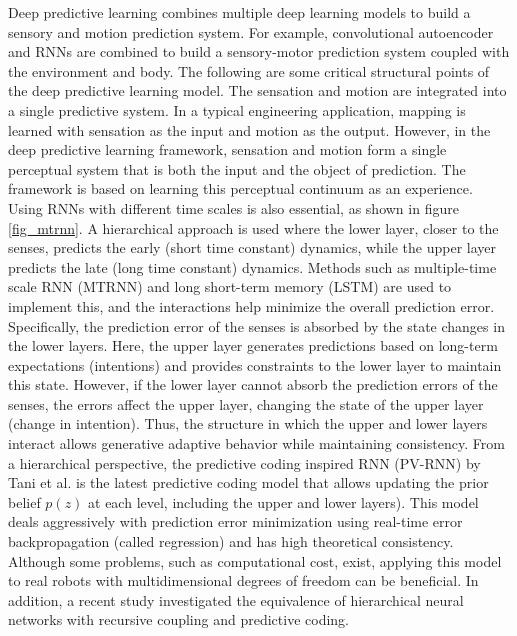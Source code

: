 Deep predictive learning combines multiple deep learning models to build a sensory and motion prediction system. For example, convolutional autoencoder and RNNs are combined to build a sensory-motor prediction system coupled with the environment and body. The following are some critical structural points of the deep predictive learning model. The sensation and motion are integrated into a single predictive system. In a typical engineering application, mapping is learned with sensation as the input and motion as the output. However, in the deep predictive learning framework, sensation and motion form a single perceptual system that is both the input and the object of prediction. The framework is based on learning this perceptual continuum as an experience. Using RNNs with different time scales is also essential, as shown in figure \ref{fig_mtrnn}. A hierarchical approach is used where the lower layer, closer to the senses, predicts the early (short time constant) dynamics, while the upper layer predicts the late (long time constant) dynamics. Methods such as multiple-time scale RNN (MTRNN)\cite{yamashita2008emergence} and long short-term memory (LSTM)\cite{Hochreiter1997nc} are used to implement this, and the interactions help minimize the overall prediction error. Specifically, the prediction error of the senses is absorbed by the state changes in the lower layers. Here, the upper layer generates predictions based on long-term expectations (intentions) and provides constraints to the lower layer to maintain this state. However, if the lower layer cannot absorb the prediction errors of the senses, the errors affect the upper layer, changing the state of the upper layer (change in intention). Thus, the structure in which the upper and lower layers interact allows generative adaptive behavior while maintaining consistency. From a hierarchical perspective, the predictive coding inspired RNN (PV-RNN) by Tani et al. is the latest predictive coding model that allows updating the prior belief $p(z)$ at each level, including the upper and lower layers)\cite{ahmadi2019novel}. This model deals aggressively with prediction error minimization using real-time error backpropagation (called regression) and has high theoretical consistency. Although some problems, such as computational cost, exist, applying this model to real robots with multidimensional degrees of freedom can be beneficial. In addition, a recent study investigated the equivalence of hierarchical neural networks with recursive coupling and predictive coding\cite{isomura2022canonical}.




